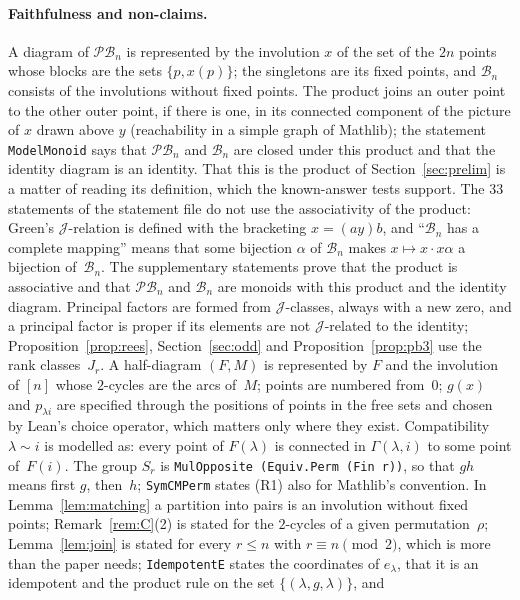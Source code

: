 \documentclass[11pt]{article}
\theoremstyle{remark}
\newcommand{\B}{\mathcal B}
\newcommand{\PB}{\mathcal{PB}}
\begin{document}
\paragraph{Faithfulness and non-claims.}
A diagram of $\PB_n$ is represented by the involution $x$ of the set of the
$2n$ points whose blocks are the sets $\{p,x(p)\}$; the singletons are its
fixed points, and $\B_n$ consists of the involutions without fixed points. The
product joins an outer point to the other outer point, if there is one, in its
connected component of the picture of $x$ drawn above $y$ (reachability in a
simple graph of Mathlib); the statement \texttt{ModelMonoid} says that $\PB_n$
and $\B_n$ are closed under this product and that the identity diagram is an
identity. That this is the product of Section~\ref{sec:prelim} is a matter of
reading its definition, which the known-answer tests support. The $33$
statements of the statement file do not use the associativity of the product:
Green's $\mathcal J$-relation is defined with the bracketing $x=(ay)b$, and
``$\B_n$ has a complete mapping'' means that some bijection $\alpha$ of $\B_n$
makes $x\mapsto x\cdot x\alpha$ a bijection of~$\B_n$. The supplementary
statements prove that the product is associative and that $\PB_n$ and $\B_n$
are monoids with this product and the identity diagram. Principal factors are formed from $\mathcal J$-classes,
always with a new zero, and a principal factor is proper if its elements are
not $\mathcal J$-related to the identity; Proposition~\ref{prop:rees},
Section~\ref{sec:odd} and Proposition~\ref{prop:pb3} use the rank
classes~$J_r$. A half-diagram $(F,M)$ is represented by $F$ and the involution
of $[n]$ whose $2$-cycles are the arcs of~$M$; points are numbered from~$0$;
$g(x)$ and $p_{\lambda i}$ are specified through the positions of points in the
free sets and chosen by Lean's choice operator, which matters only where they
exist. Compatibility $\lambda\sim i$ is modelled as: every point of
$F(\lambda)$ is connected in $\Gamma(\lambda,i)$ to some point of~$F(i)$. The
group $S_r$ is \texttt{MulOpposite (Equiv.Perm (Fin r))}, so that $gh$ means
first $g$, then~$h$; \texttt{SymCMPerm} states (R1) also for Mathlib's
convention. In Lemma~\ref{lem:matching} a partition into pairs is an involution
without fixed points; Remark~\ref{rem:C}(2) is stated for the $2$-cycles of a
given permutation~$\rho$; Lemma~\ref{lem:join} is stated for every $r\le n$
with $r\equiv n\pmod2$, which is more than the paper needs;
\texttt{IdempotentE} states the coordinates of $e_\lambda$, that it is an
idempotent and the product rule on the set $\{(\lambda,g,\lambda)\}$, and
\end{document}
